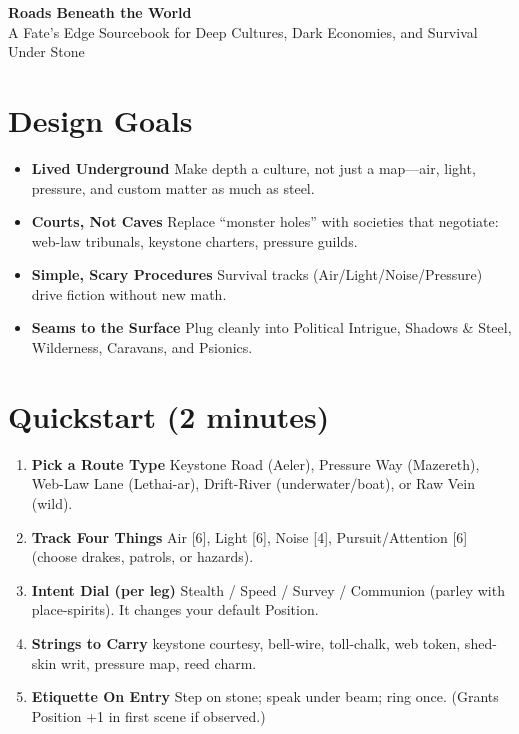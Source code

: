 \documentclass[11pt]{article}
\begin{document}


\begin{center}
    {\LARGE \textbf{Roads Beneath the World}} \\
    {\large A Fate's Edge Sourcebook for Deep Cultures, Dark Economies, and Survival Under Stone}
\end{center}

\tableofcontents
\newpage

\section*{Design Goals}
\begin{itemize}
    \item \textbf{Lived Underground} Make depth a culture, not just a map---air, light, pressure, and custom matter as much as steel.
    \item \textbf{Courts, Not Caves} Replace ``monster holes'' with societies that negotiate: web-law tribunals, keystone charters, pressure guilds.
    \item \textbf{Simple, Scary Procedures} Survival tracks (Air/Light/Noise/Pressure) drive fiction without new math.
    \item \textbf{Seams to the Surface} Plug cleanly into Political Intrigue, Shadows \& Steel, Wilderness, Caravans, and Psionics.
\end{itemize}

\section*{Quickstart (2 minutes)}
\begin{enumerate}
    \item \textbf{Pick a Route Type} Keystone Road (Aeler), Pressure Way (Mazereth), Web-Law Lane (Lethai-ar), Drift-River (underwater/boat), or Raw Vein (wild).
    \item \textbf{Track Four Things} Air [6], Light [6], Noise [4], Pursuit/Attention [6] (choose drakes, patrols, or hazards).
    \item \textbf{Intent Dial (per leg)} Stealth / Speed / Survey / Communion (parley with place-spirits). It changes your default Position.
    \item \textbf{Strings to Carry} keystone courtesy, bell-wire, toll-chalk, web token, shed-skin writ, pressure map, reed charm.
    \item \textbf{Etiquette On Entry} Step on stone; speak under beam; ring once. (Grants Position +1 in first scene if observed.)
\end{enumerate}
\end{document}

